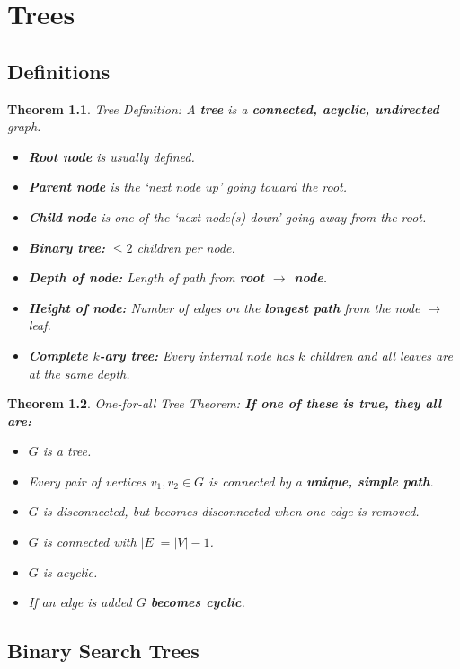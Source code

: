 \documentclass[a4paper,12pt]{report}
\newtheorem{theorem}{Theorem}
\begin{document}
\chapter{Trees}

\section{Definitions}

\begin{theorem}{Tree Definition:}
A \textbf{tree} is a \textbf{connected, acyclic, undirected} graph.
\begin{itemize}
\item \textbf{Root node} is usually defined.
\item \textbf{Parent node} is the `next node up' going toward the root.
\item \textbf{Child node} is one of the `next node(s) down' going away from the root.
\item \textbf{Binary tree: } $\leq 2$ children per node.
\item \textbf{Depth of node: } Length of path from \textbf{root $\to$ node}.
\item \textbf{Height of node: } Number of edges on the \textbf{longest path} from the node $\to$ leaf. 
\item \textbf{Complete $k$-ary tree: } Every \textit{internal node} has $k$ children and all leaves are at the same depth.
\end{itemize}
\end{theorem}


\begin{theorem}{One-for-all Tree Theorem:}
\textbf{If one of these is true, they all are: } 
\begin{itemize}
\item $G$ is a tree.
\item Every pair of vertices $v_1, v_2\in G$ is connected by a \textbf{unique, simple path}.
\item $G$ is disconnected, but becomes disconnected when one edge is removed.
\item $G$ is connected with $|E| = |V|-1$.
\item $G$ is acyclic.
\item If an edge is added $G$ \textbf{becomes cyclic}.
\end{itemize}
\end{theorem}



\section{Binary Search Trees}
\end{document}
